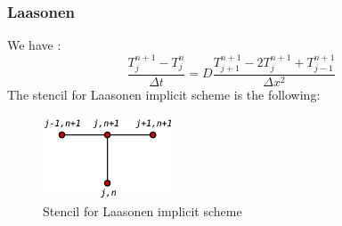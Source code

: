 \documentclass{article}
\begin{document}
                    \subsubsection{Laasonen}
    
                    We have :
                    \begin{equation}
                        \frac{T_{j}^{n+1} - T_{j}^n}{\Delta t} = D \frac{T_{j+1}^{n+1}- 2T_{j}^{n+1} + T_{j-1}^{n+1}}{\Delta x^2}
                    \end{equation}
                    The stencil for Laasonen implicit scheme is the following:
                    \begin{figure}[H]
                        \includegraphics[width=4cm]{stencil_implicit.png}
                        \centering
                        \caption{Stencil for Laasonen implicit scheme}
                    \end{figure}
    
\end{document}
